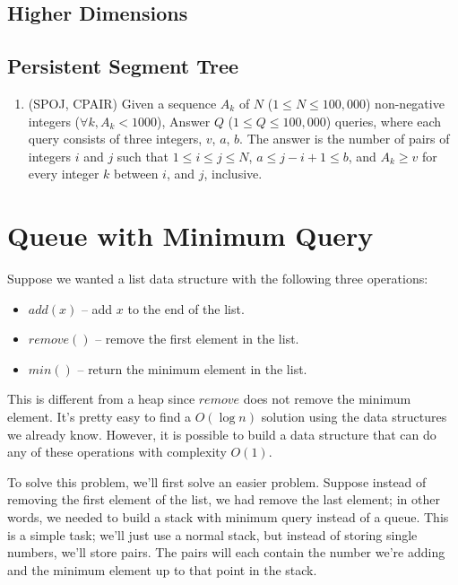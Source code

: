 \documentclass[11pt]{book}
\begin{document}
\subsection{Higher Dimensions}

\subsection{Persistent Segment Tree}

\begin{enumerate}

\item
(SPOJ, CPAIR)
Given a sequence $A_k$ of $N$ ($1 \le N \le 100, 000$) non-negative integers ($\forall k, A_k < 1000$), Answer $Q$ ($1 \le Q \le
100, 000$) queries, where each query consists of three integers, $v$, $a$, $b$. The answer is the number of pairs of
integers $i$ and $j$ such that $1 \le i \le j \le N$, $a \le j - i + 1 \le b$, and $A_k \ge v$ for every integer $k$ between $i$, and
$j$, inclusive.

\end{enumerate}

\section{Queue with Minimum Query}

Suppose we wanted a list data structure with the following three operations:

\begin{itemize}

\item
$add(x)$ -- add $x$ to the end of the list.

\item
$remove()$ -- remove the first element in the list.

\item
$min()$ -- return the minimum element in the list.

\end{itemize}

This is different from a heap since $remove$ does not remove the minimum element. It's pretty easy to find a $O(\log{n})$ solution using the data structures we already know. However, it is possible to build a data structure that can do any of these operations with complexity $O(1)$.

To solve this problem, we'll first solve an easier problem. Suppose instead of removing the first element of the list, we had remove the last element; in other words, we needed to build a stack with minimum query instead of a queue. This is a simple task; we'll just use a normal stack, but instead of storing single numbers, we'll store pairs. The pairs will each contain the number we're adding and the minimum element up to that point in the stack.
\end{document}
